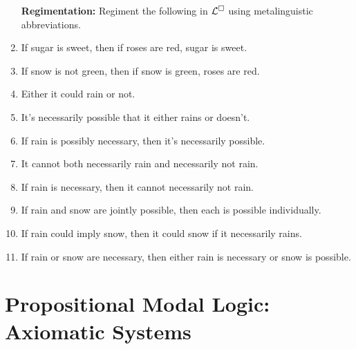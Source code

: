 \documentclass[a4paper, 11pt]{article} %
\begin{document}
\begin{enumerate}[leftmargin=1.2in,itemsep=2pt]\small
	\item[\bf Regimentation:] Regiment the following in $\mathcal{L}^{\square}$ using metalinguistic abbreviations.
  \item If sugar is sweet, then if roses are red, sugar is sweet.
  \item If snow is not green, then if snow is green, roses are red.
	\item Either it could rain or not.
	\item It's necessarily possible that it either rains or doesn't.
	\item If rain is possibly necessary, then it's necessarily possible.
	\item It cannot both necessarily rain and necessarily not rain.
	\item If rain is necessary, then it cannot necessarily not rain.
	\item If rain and snow are jointly possible, then each is possible individually.
	\item If rain could imply snow, then it could snow if it necessarily rains.
	\item If rain or snow are necessary, then either rain is necessary or snow is possible.
\end{enumerate}



\section*{\sc Propositional Modal Logic: Axiomatic Systems}
\end{document}
